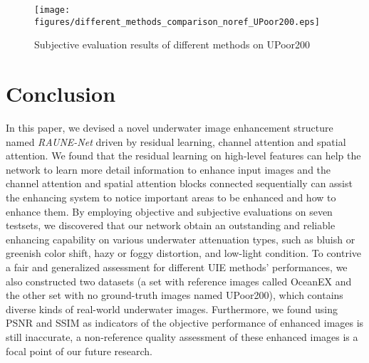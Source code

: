 \documentclass[runningheads]{llncs}
\begin{document}
\begin{figure}
    \centering
    \texttt{[image: figures/different\_methods\_comparison\_noref\_UPoor200.eps]}
    \caption{Subjective evaluation results of different methods on UPoor200}
    \label{different-methods-noref-UPoor200}
\end{figure}

\section{Conclusion}\label{sec.5}
In this paper, we devised a novel underwater image enhancement structure named \textit{RAUNE-Net} driven by residual learning, channel attention and spatial attention. We found that the residual learning on high-level features can help the network to learn more detail information to enhance input images and the channel attention and spatial attention blocks connected sequentially can assist the enhancing system to notice important areas to be enhanced and how to enhance them. By employing objective and subjective evaluations on seven testsets, we discovered that our network obtain an outstanding and reliable enhancing capability on various underwater attenuation types, such as bluish or greenish color shift, hazy or foggy distortion, and low-light condition. To contrive a fair and generalized assessment for different UIE methods' performances, we also constructed two datasets (a set with reference images called OceanEX and the other set with no ground-truth images named UPoor200), which contains diverse kinds of real-world underwater images. Furthermore, we found using PSNR and SSIM as indicators of the objective performance of enhanced images is still inaccurate, a non-reference quality assessment of these enhanced images is a focal point of our future research.



\end{document}
